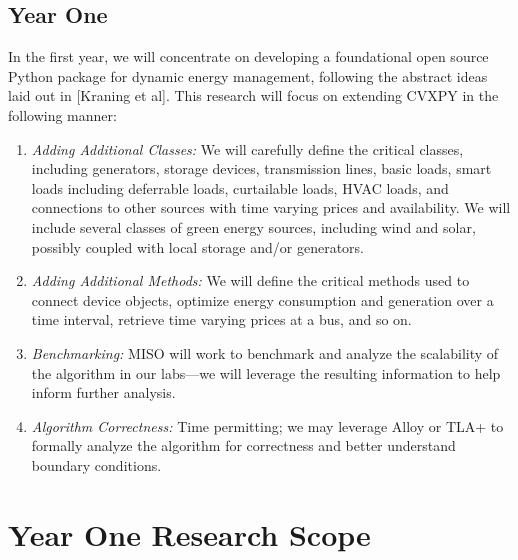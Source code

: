 \documentclass[12pt]{article}
\begin{document}
\subsection{Year One}
In the first year,
we will concentrate on developing a foundational open source Python package
for dynamic energy management,
following the abstract ideas laid out in [Kraning et al].
This research will focus on extending CVXPY in the following manner:
\begin{enumerate}
\item \emph{Adding Additional Classes:}
We will carefully define the critical classes,
including generators, storage devices, transmission lines,
basic loads, smart loads including deferrable loads, curtailable loads, HVAC loads,
and connections to other sources with time varying prices and availability.
We will include several classes of green energy sources, including wind and solar,
possibly coupled with local storage and/or generators.

\item \emph{Adding Additional Methods:}
We will define the critical methods used to connect device objects,
optimize energy consumption and generation over a time interval,
retrieve time varying prices at a bus, and so on.

\item \emph{Benchmarking:}
MISO will work to benchmark and analyze the scalability of the algorithm
in our labs---we will leverage the resulting information to help inform further analysis.

\item \emph{Algorithm Correctness:}
Time permitting;
we may leverage Alloy or TLA+ to formally analyze the algorithm for correctness
and better understand boundary conditions.
\end{enumerate}

\section{Year One Research Scope}
\end{document}
